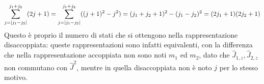 \begin{equation*}
	\sum_{j = \left\lvert j_1 - j_2\right\rvert}^{j_1 + j_2} (2j + 1) = \sum_{j = \left\lvert j_1 - j_2\right\rvert}^{j_1 + j_2} ((j+1)^2 - j^2) = (j_1 + j_2 + 1)^2 - (j_1 - j_2)^2 = (2j_1 + 1) (2j_2 + 1)
\end{equation*}
Questo è proprio il numero di stati che si ottengono nella rappresentazione disaccoppiata: queste rappresentazioni sono infatti equivalenti, con la differenza che nella rappresentazione accoppiata non sono noti $ m_1 $ ed $ m_2 $, dato che $ \hat{J}_{1,z},\hat{J}_{2,z} $ non commutano con $ \hat{J}^2 $, mentre in quella disaccoppiata non è noto $ j $ per lo stesso motivo.










